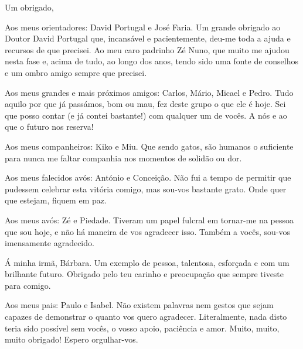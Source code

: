 \documentclass[class=report, crop=false, a4paper, 12pt]{standalone}
\begin{document}
\noindent Um obrigado,

\vspace{0.5\baselineskip}
\par Aos meus orientadores: David Portugal e José Faria. Um grande obrigado ao Doutor David Portugal que, incansável e pacientemente, deu-me toda a ajuda e recursos de que precisei. Ao meu caro padrinho Zé Nuno, que muito me ajudou nesta fase e, acima de tudo, ao longo dos anos, tendo sido uma fonte de conselhos e um ombro amigo sempre que precisei.

\vspace{0.5\baselineskip}
\par Aos meus grandes e mais próximos amigos: Carlos, Mário, Micael e Pedro. Tudo aquilo por que já passámos, bom ou mau, fez deste grupo o que ele é hoje. Sei que posso contar (e já contei bastante!) com qualquer um de vocês. A nós e ao que o futuro nos reserva!

\vspace{0.5\baselineskip}
\par Aos meus companheiros: Kiko e Miu. Que sendo gatos, são humanos o suficiente para nunca me faltar companhia nos momentos de solidão ou dor.

\vspace{0.5\baselineskip}
\par Aos meus falecidos avós: António e Conceição. Não fui a tempo de permitir que pudessem celebrar esta vitória comigo, mas sou-vos bastante grato. Onde quer que estejam, fiquem em paz.

\vspace{0.5\baselineskip}
\par Aos meus avós: Zé e Piedade. Tiveram um papel fulcral em tornar-me na pessoa que sou hoje, e não há maneira de vos agradecer isso. Também a vocês, sou-vos imensamente agradecido.

\vspace{0.5\baselineskip}
\par Á minha irmã, Bárbara. Um exemplo de pessoa, talentosa, esforçada e com um brilhante futuro. Obrigado pelo teu carinho e preocupação que sempre tiveste para comigo.

\vspace{0.5\baselineskip}
\par Aos meus pais: Paulo e Isabel. Não existem palavras nem gestos que sejam capazes de demonstrar o quanto vos quero agradecer. Literalmente, nada disto teria sido possível sem vocês, o vosso apoio, paciência e amor. Muito, muito, muito obrigado! Espero orgulhar-vos.
\end{document}
